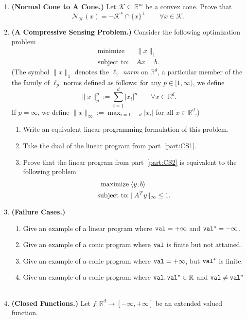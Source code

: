 \documentclass[12pt]{article}
\numberwithin{equation}{section}
\newcommand{\RR}{\mathbb{R}}
\newcommand{\st}{\text{subject to:}}
\newcommand{\minimize}{\mathrm{minimize}}
\newcommand{\maximize}{\mathrm{maximize}}
\newcommand{\cN}{\mathcal{N}}
\newcommand{\cK}{\mathcal{K}}
\newcommand{\val}{{\rm \texttt{val}}}
\theoremstyle{remark}
\DeclarePairedDelimiter{\dotp}{\langle}{\rangle}
\begin{document}
\begin{enumerate}[noitemsep]
\item {\bf (Normal Cone to A Cone.)} Let $\cK \subseteq \RR^m$ be a convex cone.  Prove that $$\cN_{\cK}(x) = -\cK^\ast \cap \{x\}^\perp \qquad \forall x \in \cK.$$
\item {\bf (A Compressive Sensing Problem.)}
Consider the following optimization problem 
\begin{align*}
\minimize&\;  \|x\|_1 \\
\st&\; Ax=b.
\end{align*}
(The symbol $\|x\|_1$ denotes the \emph{$\ell_1$ norm} on $\RR^d$, a particular member of the the family of $\ell_p$ norms defined as follows: for any $p \in [1, \infty)$, we define 
$$
\|x\|_p^p := \sum_{i=1}^d |x_i|^p \qquad \forall x \in \RR^d.
$$
If $ p = \infty$, we define $\|x\|_\infty := \max_{i = 1, \ldots, d} |x_i|$ for all $x \in \RR^d$.)
\begin{enumerate}[noitemsep]
\item\label{part:CS1} Write an equivalent linear programming formulation of this problem.
\item \label{part:CS2}Take the dual of the linear program from part~\ref{part:CS1}.
\item Prove that the linear program from part~\ref{part:CS2} is equivalent to the following problem
\begin{align*}
\maximize &\;  \dotp{y, b} \\
\st&\; \|A^Ty\|_\infty \leq 1.
\end{align*}
\end{enumerate}
\item {\bf (Failure Cases.)} 
\begin{enumerate}
\item Give an example of a linear program where $\val = + \infty$ and $\val^\ast = -\infty$.
\item Give an example of a conic program where $\val$ is finite but not attained. 
\item Give an example of a conic program where $\val = + \infty$, but $\val^\ast$ is finite. 
\item Give an example of a conic program where $\val, \val^\ast \in \RR$ and $\val \neq \val^\ast$.
\end{enumerate}
\item {\bf (Closed Functions.)}  Let $f : \RR^d \rightarrow [-\infty, + \infty]$ be an extended valued function.
\begin{enumerate}[noitemsep]

\end{enumerate}
\end{enumerate}
\end{document}

